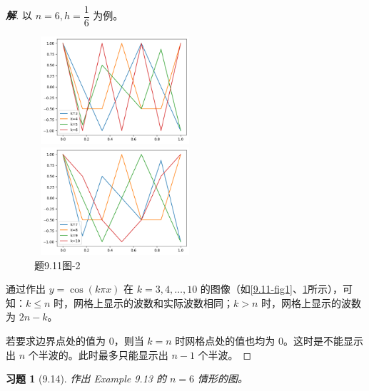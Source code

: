 \documentclass{ctexart}
\newtheorem{ex}{习题}
\newenvironment{sol}{\begin{proof}[\bf 解]}{\end{proof}}
\begin{document}
\begin{sol}
    以 $n=6,h=\dfrac 16$ 为例。

    \begin{figure}[htbp]
        \begin{minipage}{6cm}
            \centering
            \includegraphics[width = 6cm, height = 4cm]{11-1.png}
            \caption{题9.11图-1}
            \label{9.11-fig1}
        \end{minipage}
        \qquad
        \begin{minipage}{6cm}
            \centering
            \includegraphics[width = 6cm, height = 4cm]{11-2.png}
            \caption{题9.11图-2}
            \label{9.11-fig2}
        \end{minipage}
    \end{figure}

    通过作出 $y=\cos(k\pi x)$ 在 $k=3,4,\dots,10$ 的图像（如\ref{9.11-fig1}、\ref{9.11-fig2}所示），可知：$k\leq n$ 时，网格上显示的波数和实际波数相同；$k>n$ 时，网格上显示的波数为 $2n-k$。

    若要求边界点处的值为 $0$，则当 $k=n$ 时网格点处的值也均为 $0$。这时是不能显示出 $n$ 个半波的。此时最多只能显示出 $n-1$ 个半波。
\end{sol}

\begin{ex}[9.14]
    作出 Example 9.13 的 $n=6$ 情形的图。
\end{ex}
\end{document}
